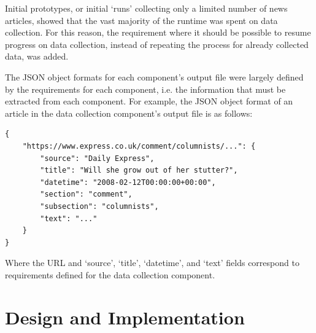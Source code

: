 \documentclass{report}
\begin{document}
Initial prototypes, or initial `runs' collecting only a limited number of news articles, showed that the vast majority of the runtime was spent on data collection.
For this reason, the requirement where it should be possible to resume progress on data collection, instead of repeating the process for already collected data, was added.

The JSON object formats for each component's output file were largely defined by the requirements for each component, i.e. the information that must be extracted from each component.
For example, the JSON object format of an article in the data collection component's output file is as follows:
\begin{lstlisting}
{
	"https://www.express.co.uk/comment/columnists/...": {
		"source": "Daily Express",
		"title": "Will she grow out of her stutter?",
		"datetime": "2008-02-12T00:00:00+00:00",
		"section": "comment",
		"subsection": "columnists",
		"text": "..."
	}
}
\end{lstlisting}

Where the URL and `source', `title', `datetime', and `text' fields correspond to requirements defined for the data collection component.



\chapter{Design and Implementation} \label{Design and Implementation} %

\end{document}
